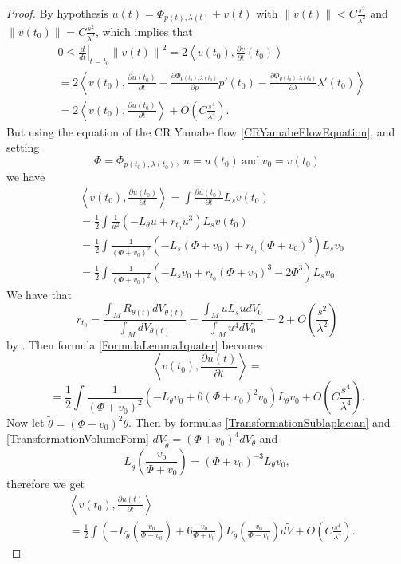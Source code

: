 \documentclass[10pt,a4paper]{amsart}
\newcommand{\de}{\partial}
\newcommand{\N}[1]{\left\lVert#1\right\rVert}
\newcommand{\bra}{\left\langle}
\newcommand{\ket}{\right\rangle}
\begin{document}
\begin{proof}
 By hypothesis $u(t)=\Phi_{p(t),\lambda(t)}+v(t)$ with $\N{v(t)}<C\frac{s^2}{\lambda^2}$ and $\N{v(t_0)}=C\frac{s^2}{\lambda^2}$, which implies that
 \begin{align}
 \nonumber
 &0\le\left.\frac{d}{dt}\right|_{t=t_0}\N{v(t)}^2=2\bra v(t_0),\frac{\de v}{\de t}(t_0)\ket\\
 \nonumber
 &=2\bra v(t_0),\frac{\de u(t_0)}{\de t}-\frac{\de\Phi_{p(t_0),\lambda(t_0)}}{\de p}p'(t_0) -\frac{\de\Phi_{p(t_0),\lambda(t_0)}}{\de \lambda}\lambda'(t_0)\ket\\
\label{FormulaLemma1ter}
 &= 2\bra v(t_0),\frac{\de u(t_0)}{\de t}\ket + O\left(C\frac{s^4}{\lambda^4}\right).
 \end{align}
 But using the equation of the CR Yamabe flow \eqref{CRYamabeFlowEquation}, and setting \[\Phi=\Phi_{p(t_0),\lambda(t_0)},\ u=u(t_0)\ \mbox{and}\ v_0=v(t_0)\] we have 
 \begin{align}
 \nonumber
 &\bra v(t_0),\frac{\de u(t_0)}{\de t}\ket = \int \frac{\de u(t_0)}{\de t} L_sv(t_0)\\
 \nonumber
 &=\frac{1}{2}\int\frac{1}{u^2}\left(-L_{\theta}u +r_{t_0}u^3\right)L_sv(t_0)\\
 \nonumber
&=\frac{1}{2}\int\frac{1}{(\Phi+v_0)^2}\left(-L_s(\Phi+v_0) +r_{t_0}(\Phi+v_0)^3\right)L_sv_0\\
\label{FormulaLemma1quater}
 &=\frac{1}{2}\int\frac{1}{(\Phi+v_0)^2}\left(-L_sv_0 +r_{t_0}(\Phi+v_0)^3-2\Phi^3\right)L_sv_0
\end{align}
We have that
$$r_{t_0}=\frac{\int_MR_{\theta(t)}dV_{\theta(t)}}{\int_MdV_{\theta(t)}} = \frac{\int_MuL_sudV_0}{\int_Mu^4dV_0}=2+O\left(\frac{s^2}{\lambda^2}\right)$$
by \cite[Section B]{CMY2}. Then formula \eqref{FormulaLemma1quater} becomes
$$\bra v(t_0),\frac{\de u(t)}{\de t}\ket =$$
$$=\frac{1}{2}\int\frac{1}{(\Phi+v_0)^2}\left(-L_{\theta}v_0 +6(\Phi+v_0)^2v_0\right)L_{\theta}v_0 +O\left(C\frac{s^4}{\lambda^4}\right) .$$
Now let $\widetilde{\theta}=(\Phi+v_0)^2\theta$.
Then by formulas \eqref{TransformationSublaplacian} and \eqref{TransformationVolumeForm} $dV_{\widetilde{\theta}}=(\Phi+v_0)^4dV_{\theta}$ and
$$L_{\widetilde{\theta}}\left(\frac{v_0}{\Phi+v_0}\right)=(\Phi+v_0)^{-3}L_{\theta}v_0,$$
therefore we get
\begin{align}
\nonumber
&\bra v(t_0),\frac{\de u(t)}{\de t}\ket\\
\label{FormulaProofLemma1}
&=\frac{1}{2}\int\left(-L_{\widetilde{\theta}}\left(\frac{v_0}{\Phi+v_0}\right) +6\frac{v_0}{\Phi+v_0}\right)L_{\widetilde{\theta}}\left(\frac{v_0}{\Phi+v_0}\right)d\widetilde{V} +O\left(C\frac{s^4}{\lambda^4}\right).
\end{align}


\end{proof}
\end{document}
